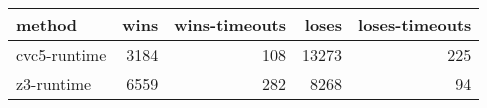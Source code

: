 \begin{tabular}{lrrrr}
\hline
 method       &   wins &   wins-timeouts &   loses &   loses-timeouts \\
\hline
 cvc5-runtime &   3184 &             108 &   13273 &              225 \\
 z3-runtime   &   6559 &             282 &    8268 &               94 \\
\hline
\end{tabular}
